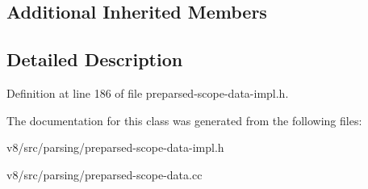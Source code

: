 \subsection*{Additional Inherited Members}


\subsection{Detailed Description}


Definition at line 186 of file preparsed-\/scope-\/data-\/impl.\+h.



The documentation for this class was generated from the following files\+:\begin{DoxyCompactItemize}
\item 
v8/src/parsing/preparsed-\/scope-\/data-\/impl.\+h\item 
v8/src/parsing/preparsed-\/scope-\/data.\+cc\end{DoxyCompactItemize}
